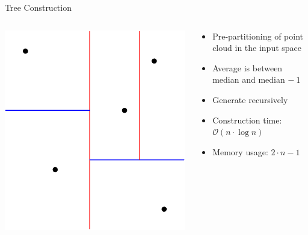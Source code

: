 \documentclass{beamer}
\begin{document}
\begin{frame}{Tree Construction}
	\begin{columns}
		\begin{column}{0.4\textwidth}
			\includegraphics[width=1.0\textwidth]{kdtree_4.pdf}
		\end{column}
		\begin{column}{0.6\textwidth}
			\begin{itemize}
				\item Pre-partitioning of point cloud in the input space
				\item Average is between median and median $-\ 1$
				\item Generate recursively
				\item Construction time: $\mathcal{O}(n \cdot \log{n})$
				\item Memory usage: $2 \cdot n - 1 $
			\end{itemize}
		\end{column}
	\end{columns}
\end{frame}
\end{document}
